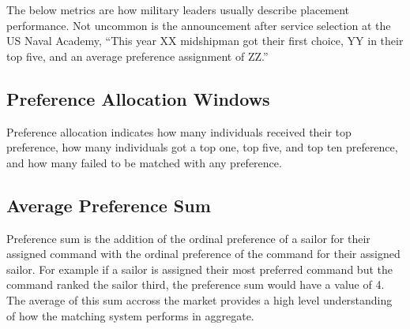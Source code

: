 The below metrics are how  military leaders usually describe placement performance. Not uncommon is the announcement after service selection at the US Naval Academy, ``This year XX midshipman got their first choice, YY in their top five, and an average preference assignment of ZZ.''

\subsection{Preference Allocation Windows}
\label{windows}
Preference allocation indicates how many individuals received their top preference, how many individuals got a top one, top five, and top ten preference, and how many failed to be matched with any preference.

\subsection{Average Preference Sum}
\label{pref_sum}
Preference sum is the addition of the ordinal preference of a sailor for their assigned command with the ordinal preference of the command for their assigned sailor. For example if a sailor is assigned their most preferred command but the command ranked the sailor third, the preference sum would have a value of 4. The average of this sum accross the market provides a high level understanding of how the matching system performs in aggregate.


